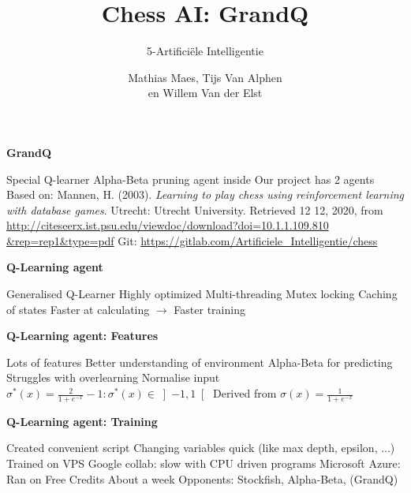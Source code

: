 \documentclass[compress]{beamer}
\title{Chess AI: GrandQ}
\subtitle{5-Artificiële Intelligentie}
\author{Mathias Maes, Tijs Van Alphen\\ en Willem Van der Elst}
\newcommand{\slidetitle}[1]{\textbf{\Large{#1}}\vspace{5mm}}
\begin{document}
\maketitle

\begin{frame}
    \slidetitle{GrandQ}
    \begin{outline}
        \1 Special Q-learner
            \2 Alpha-Beta pruning agent inside
        \1 Our project has 2 agents
        \1 Based on:
            \2 Mannen, H. (2003). \textit{Learning to play chess using reinforcement learning with database games}. Utrecht: Utrecht University. Retrieved 12 12, 2020, from \href{http://citeseerx.ist.psu.edu/viewdoc/download?doi=10.1.1.109.810&rep=rep1&type=pdf}{http://citeseerx.ist.psu.edu/viewdoc/download?doi=10.1.1.109.810\\\&rep=rep1\&type=pdf}
            \1 Git: \href{https://gitlab.com/Artificiele_Intelligentie/chess}{https://gitlab.com/Artificiele\_Intelligentie/chess}
    \end{outline}

\end{frame}

\begin{frame}
    \slidetitle{Q-Learning agent}
    \begin{outline}
        \1 Generalised Q-Learner
        \1 Highly optimized
            \2 Multi-threading
                \3 Mutex locking
            \2 Caching of states
        \1 Faster at calculating $\rightarrow$ Faster training
    \end{outline}
\end{frame}

\begin{frame}
    \slidetitle{Q-Learning agent: Features}
    \begin{outline}
        \1 Lots of features
            \2 Better understanding of environment
            \2 Alpha-Beta for predicting
        \1 Struggles with overlearning
            \2 Normalise input
            \2 $\sigma^*(x) = \frac{2}{1 + e^{-x}} -1: \sigma^*(x) \in \left]-1, 1\right[ $ 
            \3 Derived from $\sigma(x) = \frac{1}{1+e^{-x}}$
    \end{outline}
\end{frame}

\begin{frame}
    \slidetitle{Q-Learning agent: Training}

    \begin{outline}
        \1 Created convenient script
            \2 Changing variables quick (like max depth, epsilon, ...)
        \1 Trained on VPS
            \2 Google collab: slow with CPU driven programs
            \2 Microsoft Azure:
                \3 Ran on Free Credits
                \3 About a week
                \1 Opponents: Stockfish, Alpha-Beta, (GrandQ)
    \end{outline}

\end{frame}
\end{document}
